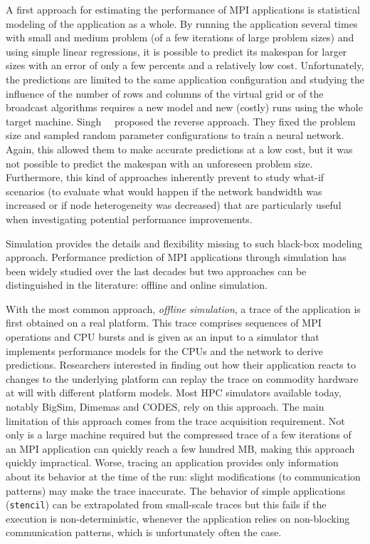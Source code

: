         A first approach for estimating the performance of MPI applications is statistical modeling of the application
        as a whole\cite{hpl_prediction}.  By running the application several times with small and medium problem (of a
        few iterations of large problem sizes) and using simple linear regressions, it is possible to predict its
        makespan for larger sizes with an error of only a few percents and a relatively low cost.  Unfortunately, the
        predictions are limited to the same application configuration and studying the influence of the number of rows
        and columns of the virtual grid or of the broadcast algorithms requires a new model and new (costly) runs using
        the whole target machine.  Singh~\etal~\cite{Singh_2007} proposed the reverse approach. They fixed the problem
        size and sampled random parameter configurations to train a neural network. Again, this allowed them to make
        accurate predictions at a low cost, but it was not possible to predict the makespan with an unforeseen problem
        size. Furthermore, this kind of approaches inherently prevent to study what-if scenarios (\eg to evaluate what
        would happen if the network bandwidth was increased or if node heterogeneity was decreased) that are
        particularly useful when investigating potential performance improvements.

        Simulation provides the details and flexibility missing to such black-box modeling approach. Performance
        prediction of MPI applications through simulation has been widely studied over the last decades but two
        approaches can be distinguished in the literature: offline and online simulation.

        With the most common approach, \emph{offline simulation}, a trace of the application is first obtained on a real
        platform. This trace comprises sequences of MPI operations and CPU bursts and is given as an input to a
        simulator that implements performance models for the CPUs and the network to derive predictions. Researchers
        interested in finding out how their application reacts to changes to the underlying platform can replay the
        trace on commodity hardware at will with different platform models.  Most HPC simulators available today,
        notably BigSim\cite{bigsim_04}, Dimemas\cite{dimemas} and CODES\cite{CODES}, rely on this approach.  The main
        limitation of this approach comes from the trace acquisition requirement. Not only is a large machine required
        but the compressed trace of a few iterations of an MPI application can quickly reach a few hundred MB, making
        this approach quickly impractical\cite{suter}.  Worse, tracing an application provides only information about
        its behavior at the time of the run: slight modifications (\eg to communication patterns) may make the trace
        inaccurate. The behavior of simple applications (\eg \texttt{stencil}) can be extrapolated from small-scale
        traces\cite{scalaextrap,pmac_lspp13} but this fails if the execution is non-deterministic, \eg whenever the
        application relies on non-blocking communication patterns, which is unfortunately often the case.

